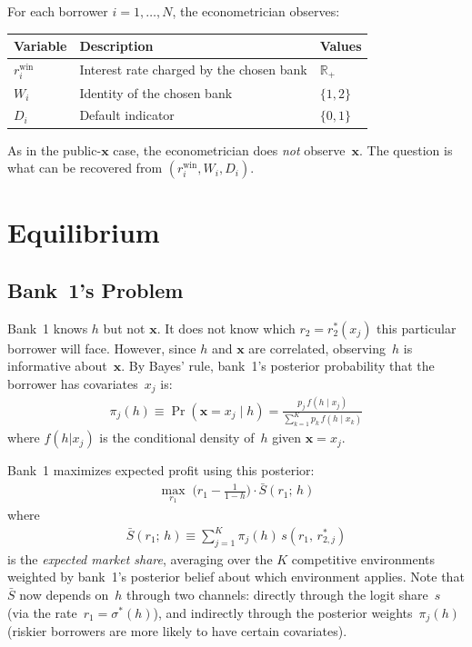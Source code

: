 \documentclass[12pt]{article}
\theoremstyle{plain}
\theoremstyle{plain}
\theoremstyle{definition}
\theoremstyle{remark}
\begin{document}
For each borrower $i = 1, \ldots, N$, the econometrician observes:
\begin{center}
\renewcommand{\arraystretch}{1.3}
\begin{tabular}{lll}
\toprule
\textbf{Variable} & \textbf{Description} & \textbf{Values} \\
\midrule
$r_i^{\text{win}}$ & Interest rate charged by the chosen bank & $\mathbb{R}_+$ \\
$W_i$ & Identity of the chosen bank & $\{1, 2\}$ \\
$D_i$ & Default indicator & $\{0, 1\}$ \\
\bottomrule
\end{tabular}
\end{center}
As in the public-$\mathbf{x}$ case, the econometrician does \emph{not} observe~$\mathbf{x}$.  The question is what can be recovered from $(r_i^{\text{win}}, W_i, D_i)$.


\newpage
\section{Equilibrium}\label{sec:equil8}

\subsection{Bank~1's Problem}

Bank~1 knows $h$ but not $\mathbf{x}$.  It does not know which $r_2 = r_2^*(x_j)$ this particular borrower will face.  However, since $h$ and $\mathbf{x}$ are correlated, observing~$h$ is informative about~$\mathbf{x}$.  By Bayes' rule, bank~1's posterior probability that the borrower has covariates~$x_j$ is:
\begin{align}\label{eq:posterior}
    \pi_j(h) \equiv \Pr(\mathbf{x} = x_j \mid h) = \frac{p_j\, f(h \mid x_j)}{\sum_{k=1}^K p_k\, f(h \mid x_k)}
\end{align}
where $f(h|x_j)$ is the conditional density of~$h$ given $\mathbf{x} = x_j$.

Bank~1 maximizes expected profit using this posterior:
\begin{align}\label{eq:b1_problem8}
    \max_{r_1}\; \big(r_1 - \tfrac{1}{1-h}\big) \cdot \bar{S}(r_1;\, h)
\end{align}
where
\begin{align}\label{eq:Sbar}
    \bar{S}(r_1;\, h) \equiv \sum_{j=1}^K \pi_j(h)\, s(r_1,\, r_{2,j}^*)
\end{align}
is the \emph{expected market share}, averaging over the $K$ competitive environments weighted by bank~1's posterior belief about which environment applies.  Note that $\bar{S}$ now depends on~$h$ through two channels: directly through the logit share~$s$ (via the rate~$r_1 = \sigma^*(h)$), and indirectly through the posterior weights~$\pi_j(h)$ (riskier borrowers are more likely to have certain covariates).
\end{document}
